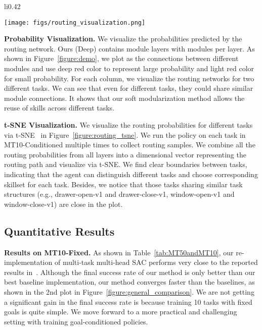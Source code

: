 \documentclass{article}
\begin{document}
\begin{wrapfigure}{li}{0.42\textwidth}
\vspace{-0.2in}
\begin{center}
\texttt{[image: figs/routing\_visualization.png]}
\vspace{-0.2in}
\caption{Probabilities from the routing network for different tasks are extracted and visualized with t-NSE. Routing probabilities from different tasks are grouped in different clusters.}
\label{figure:routing_tsne}
\vspace{-0.3in}
\end{center}
\end{wrapfigure}

\textbf{Probability Visualization.} We visualize the probabilities  predicted by the routing network. Ours (Deep) contains  module layers with  modules per layer. As shown in Figure~\ref{figure:demo}, we plot  as the connections between different modules and use deep red color to represent large probability and light red color for small probability. For each column, we visualize the routing networks for two different tasks. We can see that even for different tasks, they could share similar module connections. It shows that our soft modularization method allows the reuse of skills across different tasks. 

\textbf{t-SNE Visualization.} We visualize the routing probabilities for different tasks via t-SNE~\cite{Maaten08visualizingdata} in Figure~\ref{figure:routing_tsne}. We run the policy on each task in MT10-Conditioned multiple times to collect routing samples. We combine all the routing probabilities from all layers into a  dimensional vector representing the routing path and visualize via t-SNE. We find clear boundaries between tasks, indicating that the agent can distinguish different tasks and choose corresponding skillset for each task. Besides, we notice that those tasks sharing similar task structures (e.g., drawer-open-v1 and drawer-close-v1, window-open-v1 and window-close-v1) are close in the plot. 

\vspace{-0.1in}
\subsection{Quantitative Results}
\vspace{-0.1in}


\textbf{Results on MT10-Fixed.} As shown in Table~\ref{tab:MT50andMT10}, our re-implementation of multi-task multi-head SAC performs very close to the reported results in~\cite{yu2019meta}. Although the final success rate of our method is only  better than our best baseline implementation, our method converges faster than the baselines, as shown in the 2nd plot in Figure~\ref{figure:general_comparison}. We are not getting a significant gain in the final success rate is because training 10 tasks with fixed goals is quite simple. We move forward to a more practical and challenging setting with training  goal-conditioned policies. 
\end{document}
